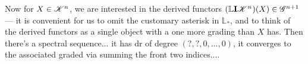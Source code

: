 \documentclass[11pt]{article}
\newcommand{\LL}[1]{{\scrK}^{#1}}%
\newcommand{\GR}[1]{\scrG^{#1}}%
\newcommand{\Ind}[2][]{\mathbf{I}{#2}_{#1}}%
\newcommand{\derived}{\mathbb{L}}
\begin{document}
Now for $X\in\LL{n}$, we are interested in the derived functors $(\derived\Ind{\LL{n}})(X)\in\GR{n+1}$ --- it is convenient for us to omit the customary asterisk in $\derived_*$, and to think of the derived functors as a single object with a one more grading than $X$ has. Then there's a spectral sequence... it has dr of degree $(?,?,0,\ldots,0)$, it converges to the associated graded via summing the front two indices....
\end{document}

